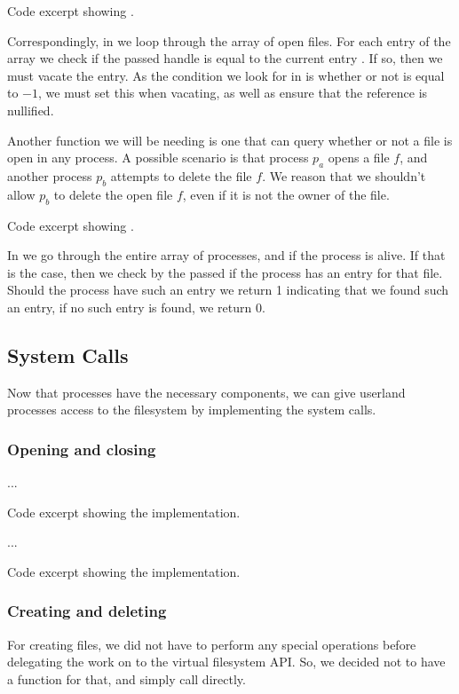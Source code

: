 {Code excerpt showing .}

Correspondingly, in  we loop through the
array of open files. For each entry of the array we check if the passed handle
is equal to the current entry . If so, then we must vacate
the entry. As the condition we look for in  is
whether or not  is equal to $-1$, we must set this when
vacating, as well as ensure that the  reference is nullified.

\newpage
Another function we will be needing is one that can query whether or not a
file is open in any process. A possible scenario is that process $p_a$ opens a
file $f$, and another process $p_b$ attempts to delete the file $f$. We reason
that we shouldn't allow $p_b$ to delete the open file $f$, even if it is not
the owner of the file.

{Code excerpt showing .}

In  we go through the entire array of processes,
and if the process is alive. If that is the case, then we check by the passed
 if the process has an entry for that file. Should the process
have such an entry we return 1 indicating that we found such an entry, if no
such entry is found, we return 0.

\subsection{System Calls}
Now that processes have the necessary components, we can give userland
processes access to the filesystem by implementing the system calls.

\subsubsection{Opening and closing}
...

{Code excerpt showing the  implementation.}

...

{Code excerpt showing the  implementation.}

\subsubsection{Creating and deleting}
For creating files, we did not have to perform any special operations before
delegating the work on to the virtual filesystem API. So, we decided not to
have a function for that, and simply call  directly.

